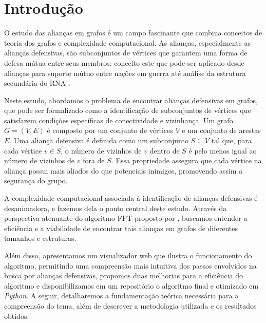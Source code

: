 \chapter{Introdução}



O estudo das alianças em grafos é um campo fascinante que combina conceitos de teoria dos grafos e complexidade computacional. As alianças, especialmente as alianças defensivas, são subconjuntos de vértices que garantem uma forma de defesa mútua entre seus membros; conceito este que pode ser aplicado desde alianças para suporte mútuo entre nações em guerra \cite{kristiansen2004alliances} até análise da estrutura secundária do RNA \cite{Haynes2006}.

Neste estudo, abordamos o problema de encontrar alianças defensivas em grafos, que pode ser formalizado como a identificação de subconjuntos de vértices que satisfazem condições específicas de conectividade e vizinhança. Um grafo $G = (V, E)$ é composto por um conjunto de vértices $V$ e um conjunto de arestas $E$. Uma aliança defensiva é definida como um subconjunto $S \subseteq V$ tal que, para cada vértice $v \in S$, o número de vizinhos de $v$ dentro de $S$ é pelo menos igual ao número de vizinhos de $v$ fora de $S$. Essa propriedade assegura que cada vértice na aliança possui mais aliados do que potenciais inimigos, promovendo assim a segurança do grupo.

A complexidade computacional associada à identificação de alianças defensivas é desanimadora, e fazemos dela o ponto central deste estudo. Através da perspectiva atenuante do algoritmo FPT proposto por \cite{Enciso2009}, buscamos entender a eficiência e a viabilidade de encontrar tais alianças em grafos de diferentes tamanhos e estruturas.

Além disso, apresentamos um visualizador web que ilustra o funcionamento do algoritmo, permitindo uma compreensão mais intuitiva dos passos envolvidos na busca por alianças defensivas, propomos duas melhorias para a eficiência do algoritmo e disponibilizamos em um repositório o algoritmo final e otimizado em \textit{Python}. A seguir, detalharemos a fundamentação teórica necessária para a compreensão do tema, além de descrever a metodologia utilizada e os resultados obtidos.

